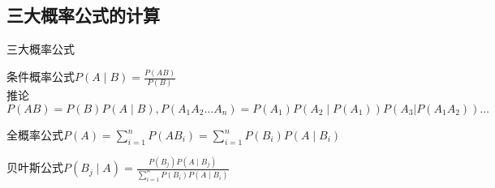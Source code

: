 \documentclass[12pt, a4paper, oneside, UTF8]{ctexbook}
\begin{document}
\subsection{三大概率公式的计算}
\begin{remark}
    三大概率公式
    \item 条件概率公式\qquad $P(A\mid B)=\frac{P(AB)}{P(B)}$ \\
    推论 $P(AB)=P(B)P(A\mid B), P(A_1A_2\ldots A_n)=P(A_1)P(A_2\mid P(A_1))P(A_3|P(A_1A_2))\ldots$
    \item 全概率公式\qquad $P(A)=\sum_{i=1}^{n}P(AB_i)=\sum_{i=1}^{n}P(B_i)P(A\mid B_i)$
    \item 贝叶斯公式\qquad $P(B_j\mid A)=\frac{P(B_j)P(A\mid B_j)}{\sum_{i=1}^{n}P(B_i)P(A\mid B_i)}$
\end{remark}
\end{document}
